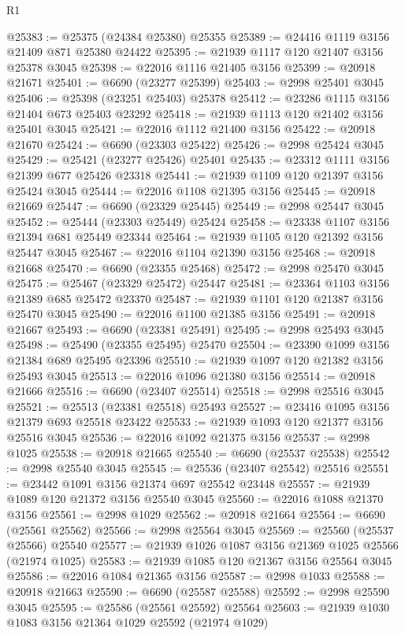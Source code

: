 \begin{lexlean}{R1}
\begin{coremodule}
@25383 := @25375 (@24384 @25380) @25355
@25389 := @24416 @1119 @3156 @21409 @871 @25380 @24422
@25395 := @21939 @1117 @120 @21407 @3156 @25378 @3045
@25398 := @22016 @1116 @21405 @3156
@25399 := @20918 @21671
@25401 := @6690 (@23277 @25399)
@25403 := @2998 @25401 @3045
@25406 := @25398 (@23251 @25403) @25378
@25412 := @23286 @1115 @3156 @21404 @673 @25403 @23292
@25418 := @21939 @1113 @120 @21402 @3156 @25401 @3045
@25421 := @22016 @1112 @21400 @3156
@25422 := @20918 @21670
@25424 := @6690 (@23303 @25422)
@25426 := @2998 @25424 @3045
@25429 := @25421 (@23277 @25426) @25401
@25435 := @23312 @1111 @3156 @21399 @677 @25426 @23318
@25441 := @21939 @1109 @120 @21397 @3156 @25424 @3045
@25444 := @22016 @1108 @21395 @3156
@25445 := @20918 @21669
@25447 := @6690 (@23329 @25445)
@25449 := @2998 @25447 @3045
@25452 := @25444 (@23303 @25449) @25424
@25458 := @23338 @1107 @3156 @21394 @681 @25449 @23344
@25464 := @21939 @1105 @120 @21392 @3156 @25447 @3045
@25467 := @22016 @1104 @21390 @3156
@25468 := @20918 @21668
@25470 := @6690 (@23355 @25468)
@25472 := @2998 @25470 @3045
@25475 := @25467 (@23329 @25472) @25447
@25481 := @23364 @1103 @3156 @21389 @685 @25472 @23370
@25487 := @21939 @1101 @120 @21387 @3156 @25470 @3045
@25490 := @22016 @1100 @21385 @3156
@25491 := @20918 @21667
@25493 := @6690 (@23381 @25491)
@25495 := @2998 @25493 @3045
@25498 := @25490 (@23355 @25495) @25470
@25504 := @23390 @1099 @3156 @21384 @689 @25495 @23396
@25510 := @21939 @1097 @120 @21382 @3156 @25493 @3045
@25513 := @22016 @1096 @21380 @3156
@25514 := @20918 @21666
@25516 := @6690 (@23407 @25514)
@25518 := @2998 @25516 @3045
@25521 := @25513 (@23381 @25518) @25493
@25527 := @23416 @1095 @3156 @21379 @693 @25518 @23422
@25533 := @21939 @1093 @120 @21377 @3156 @25516 @3045
@25536 := @22016 @1092 @21375 @3156
@25537 := @2998 @1025
@25538 := @20918 @21665
@25540 := @6690 (@25537 @25538)
@25542 := @2998 @25540 @3045
@25545 := @25536 (@23407 @25542) @25516
@25551 := @23442 @1091 @3156 @21374 @697 @25542 @23448
@25557 := @21939 @1089 @120 @21372 @3156 @25540 @3045
@25560 := @22016 @1088 @21370 @3156
@25561 := @2998 @1029
@25562 := @20918 @21664
@25564 := @6690 (@25561 @25562)
@25566 := @2998 @25564 @3045
@25569 := @25560 (@25537 @25566) @25540
@25577 := @21939 @1026 @1087 @3156 @21369 @1025 @25566 (@21974 @1025)
@25583 := @21939 @1085 @120 @21367 @3156 @25564 @3045
@25586 := @22016 @1084 @21365 @3156
@25587 := @2998 @1033
@25588 := @20918 @21663
@25590 := @6690 (@25587 @25588)
@25592 := @2998 @25590 @3045
@25595 := @25586 (@25561 @25592) @25564
@25603 := @21939 @1030 @1083 @3156 @21364 @1029 @25592 (@21974 @1029)

\end{coremodule}
\end{lexlean}
